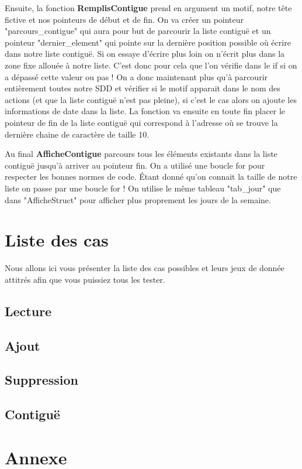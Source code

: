 \documentclass[12pt,french]{article} %
\begin{document}
Ensuite, la fonction \textbf{RemplisContigue} prend en argument un motif, notre tête fictive et nos pointeurs de début et de fin. On va créer un pointeur "parcours\_contigue" qui aura pour but de parcourir la liste contiguë et un pointeur "dernier\_element" qui pointe sur la dernière position possible où écrire dans notre liste contiguë. Si on essaye d'écrire plus loin on n'écrit plus dans la zone fixe allouée à notre liste. C'est donc pour cela que l'on vérifie dans le if si on a dépassé cette valeur ou pas ! On a donc maintenant plus qu'à parcourir entièrement toutes notre SDD et vérifier si le motif apparait dans le nom des actions (et que la liste contiguë n'est pas pleine), si c'est le cas alors on ajoute les informations de date dans la liste.
La fonction va ensuite en toute fin placer le pointeur de fin de la liste contiguë qui correspond à l'adresse où se trouve la dernière chaine de caractère de taille 10.\newline

Au final \textbf{AfficheContigue} parcours tous les éléments existants dans la liste contiguë jusqu'à arriver au pointeur fin. On a utilisé une boucle for pour respecter les bonnes normes de code. Étant donné qu'on connait la taille de notre liste on passe par une boucle for ! On utilise le même tableau "tab\_jour" que dans "AfficheStruct" pour afficher plus proprement les jours de la semaine.


\section{Liste des cas}

Nous allons ici vous présenter la liste des cas possibles et leurs jeux de donnée attitrés afin que vous puissiez tous les tester.

\subsection{Lecture}
\subsection{Ajout}
\subsection{Suppression}
\subsection{Contiguë}

\section{Annexe}
\listoffigures
\end{document}

